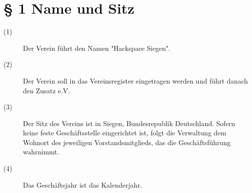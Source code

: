 \documentclass[a4paper,12pt]{scrartcl}
\begin{document}


\renewcommand{\sectionmark}[1]{\markright{#1}}
\renewcommand{\subsectionmark}[1]{}
\renewcommand{\subsubsectionmark}[1]{}
\rhead{\today}

\onehalfspacing
\renewcommand{\thesection}{\arabic{section}}
\renewcommand{\thesection}{\arabic{section}}
\setcounter{section}{0}
\setcounter{page}{1}


\section*{\S{} 1 Name und Sitz}
\begin{description} 

\item[(1)] Der Verein führt den Namen "Hackspace Siegen".
\item[(2)] Der Verein soll in das Vereinsregister eingetragen werden und führt danach den Zusatz e.V.
\item[(3)] Der Sitz des Vereins ist in Siegen, Bundesrepublik Deutschland. Sofern keine feste Geschäftsstelle eingerichtet ist, folgt die Verwaltung dem Wohnort des jeweiligen Vorstandsmitglieds, das die Geschäftsführung wahrnimmt. 
\item[(4)] Das Geschäftsjahr ist das Kalenderjahr.

\end{description}
\end{document}

